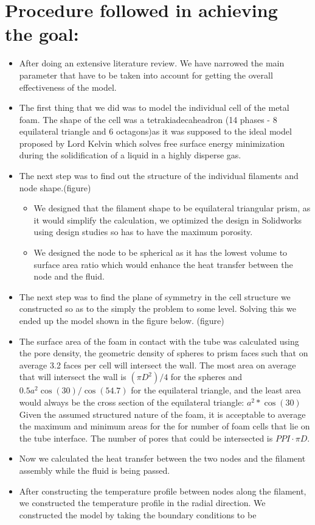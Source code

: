 \documentclass[compileTAMUreport.tex]{subfiles}
\begin{document}
\section{Procedure followed in achieving the goal:}
\begin{itemize}
\item After doing an extensive literature review. We have narrowed the main parameter that have to be taken into account for getting the overall effectiveness of the model.
\item The first thing that we did was to model the individual cell of the metal foam. The shape of the cell was a tetrakiadecaheadron (14 phases - 8 equilateral triangle and 6 octagons)as it was supposed to the ideal model proposed by Lord Kelvin which solves free surface energy minimization during the solidification of a liquid in a highly disperse gas.
\item The next step was to find out the structure of the individual filaments and node shape.(figure)
\begin{itemize}
\item We designed that the filament shape to be equilateral triangular prism, as it would simplify the calculation, we optimized the design in Solidworks using design studies so has to have the maximum porosity.
\item We designed the node to be spherical as it has the lowest volume to surface area ratio which would enhance the heat transfer between the node and the fluid.
\end{itemize}
\item	The next step was to find the plane of symmetry in the cell structure we constructed so as to the simply the problem to some level. Solving this we ended up the model shown in the figure below. (figure)
\item The surface area of the foam in contact with the tube was calculated using the pore density, the geometric density of spheres to prism faces such that on average 3.2 faces per cell will intersect the wall. The most area on average that will intersect the wall is $(\pi D^2)/4$ for the spheres and $0.5 a^2 \cos (30)/ \cos(54.7)$ for the equilateral triangle, and the least area would always be the cross section of the equilateral triangle: $a^2 * \cos(30) $ Given the assumed structured nature of the foam, it is acceptable to average the maximum and minimum areas for the for number of foam cells that lie on the tube interface. The number of pores that could be intersected is $PPI\cdot\pi D$. 
\item	Now we calculated the heat transfer between the two nodes and the filament assembly while the fluid is being passed.
\item After constructing the temperature profile between nodes along the filament, we constructed the temperature profile in the radial direction. We constructed the model by taking the boundary conditions to be 
\begin{itemize}


\end{itemize}
\end{itemize}
\end{document}
